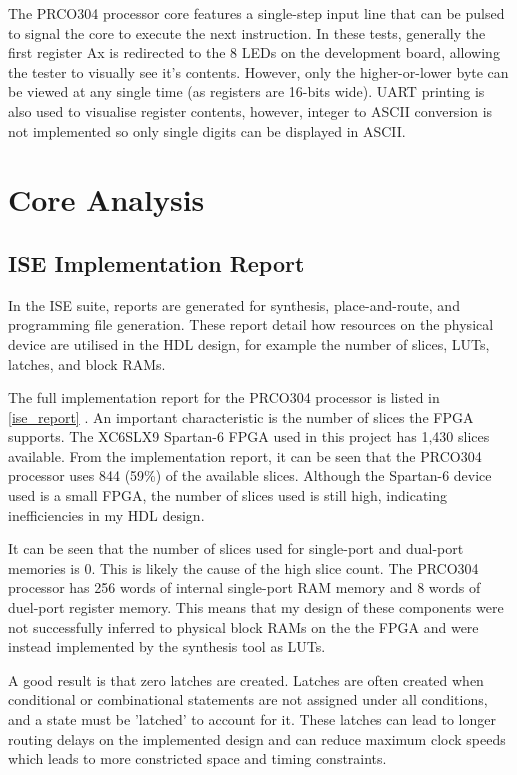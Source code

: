 \documentclass[11pt,a4paper]{report}
\newcommand{\scname}{PRCO304}
\begin{document}
\begin{itemize}
{The \scname{} processor core features a single-step input line that can be pulsed to signal the core to execute the next instruction. In these tests, generally the first register Ax is redirected to the 8 LEDs on the development board, allowing the tester to visually see it's contents. However, only the higher-or-lower byte can be viewed at any single time (as registers are 16-bits wide). UART printing is also used to visualise register contents, however, integer to ASCII conversion is not implemented so only single digits can be displayed in ASCII.}
\end{itemize}



\newpage
\section{Core Analysis}
\label{sect:core_analysis}

\subsection{ISE Implementation Report}
\label{ise_impl}
In the ISE suite, reports are generated for synthesis, place-and-route, and programming file generation. These report detail how resources on the physical device are utilised in the HDL design, for example the number of slices, LUTs, latches, and block RAMs.

The full implementation report for the \scname{} processor is listed in \ref{ise_report} {}. An important characteristic is the number of slices the FPGA supports. The XC6SLX9 Spartan-6 FPGA used in this project has 1,430 slices available. From the implementation report, it can be seen that the \scname{} processor uses 844 (59\%) of the available slices. Although the Spartan-6 device used is a small FPGA, the number of slices used is still high, indicating inefficiencies in my HDL design.

It can be seen that the number of slices used for single-port and dual-port memories is 0. This is likely the cause of the high slice count. The \scname{} processor has 256 words of internal single-port RAM memory and 8 words of duel-port register memory. This means that my design of these components were not successfully inferred to physical block RAMs on the the FPGA and were instead implemented by the synthesis tool as LUTs.

A good result is that zero latches are created. Latches are often created when conditional or combinational statements are not assigned under all conditions, and a state must be 'latched' to account for it. These latches can lead to longer routing delays on the implemented design and can reduce maximum clock speeds which leads to more constricted space and timing constraints.
\end{document}
